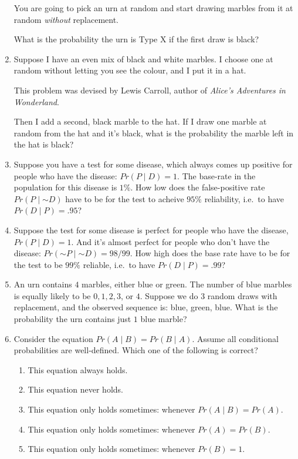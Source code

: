 \documentclass[justified]{tufte-book}
\providecommand{\tightlist}{%
  \setlength{\itemsep}{0pt}\setlength{\parskip}{0pt}}
\newcommand{\given}{\mid}
\renewcommand{\neg}{\mathbin{\sim}}
\newcommand{\p}{Pr}
\theoremstyle{definition}
\theoremstyle{definition}
\theoremstyle{definition}
\theoremstyle{definition}
\theoremstyle{remark}
\begin{document}
\begin{enumerate}
  You are going to pick an urn at random and start drawing marbles from it at random \emph{without} replacement.

  What is the probability the urn is Type X if the first draw is black?
\item
  Suppose I have an even mix of black and white marbles. I choose one at random without letting you see the colour, and I put it in a hat.

  \begin{marginfigure}
  This problem was devised by Lewis Carroll, author of \emph{Alice's
  Adventures in Wonderland}.
  \end{marginfigure}

  Then I add a second, black marble to the hat. If I draw one marble at random from the hat and it's black, what is the probability the marble left in the hat is black?
\item
  Suppose you have a test for some disease, which always comes up positive for people who have the disease: \(\p(P \given D) = 1\). The base-rate in the population for this disease is \(1\%\). How low does the false-positive rate \(\p(P \given \neg D)\) have to be for the test to acheive \(95\%\) reliability, i.e.~to have \(\p(D \given P) = .95\)?
\item
  Suppose the test for some disease is perfect for people who have the disease, \(\p(P \given D) = 1\). And it's almost perfect for people who don't have the disease: \(\p(\neg P \given \neg D) = 98/99\). How high does the base rate have to be for the test to be \(99\%\) reliable, i.e.~to have \(\p(D \given P) = .99\)?
\item
  An urn contains \(4\) marbles, either blue or green. The number of blue marbles is equally likely to be \(0, 1, 2, 3\), or \(4\). Suppose we do \(3\) random draws with replacement, and the observed sequence is: blue, green, blue. What is the probability the urn contains just \(1\) blue marble?
\item
  Consider the equation \(\p(A \given B) = \p(B \given A)\). Assume all conditional probabilities are well-defined. Which one of the following is correct?

  \begin{enumerate}
  \def\labelenumii{\alph{enumii}.}
  \tightlist
  \item
    This equation always holds.
  \item
    This equation never holds.
  \item
    This equation only holds sometimes: whenever \(\p(A \given B) = \p(A)\).
  \item
    This equation only holds sometimes: whenever \(\p(A) = \p(B)\).
  \item
    This equation only holds sometimes: whenever \(\p(B) = 1\).
  \end{enumerate}
\end{enumerate}
\end{document}
